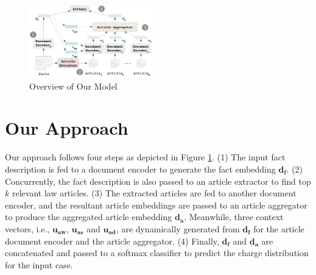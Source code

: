 
\begin{figure}[t!]
\begin{center}
\includegraphics[width=0.48\textwidth]{figures/charge_pred_overview.png}	
\caption{Overview of Our Model}
\label{fig_model_framework}
\end{center}
\end{figure}

\section{Our Approach}
Our approach follows four steps as depicted in Figure \ref{fig_model_framework}. 
(1) The input fact description is fed to a document encoder to generate the fact embedding $\mathbf{d_f}$.
(2) Concurrently, the fact description is also passed to an article extractor to find top $k$ relevant law articles. 
(3) The extracted articles are fed to another document encoder, and the resultant article embeddings are passed to an article aggregator to produce the aggregated article embedding $\mathbf{d_a}$. Meanwhile, three context vectors, i.e., $\mathbf{u_{aw}}$, $\mathbf{u_{as}}$ and $\mathbf{u_{ad}}$, are dynamically generated from $\mathbf{d_f}$ for the article document encoder and the article aggregator. 
(4) Finally, $\mathbf{d_f}$ and $\mathbf{d_a}$ are concatenated and passed to a softmax classifier to predict the charge distribution for the input case.



